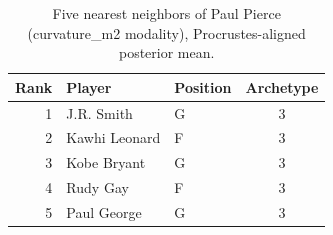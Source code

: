 \begin{table}[htbp]
  \centering\small
  \begin{tabular}{rllc}
    \toprule
    Rank & Player & Position & Archetype \\
    \midrule
    1 & J.R. Smith & G & 3 \\
    2 & Kawhi Leonard & F & 3 \\
    3 & Kobe Bryant & G & 3 \\
    4 & Rudy Gay & F & 3 \\
    5 & Paul George & G & 3 \\
    \bottomrule
  \end{tabular}
  \caption{Five nearest neighbors of Paul Pierce (curvature_m2 modality), Procrustes-aligned posterior mean.}
  \label{tab:Paul_Pierce_neighbors_curvature_m2}
\end{table}

